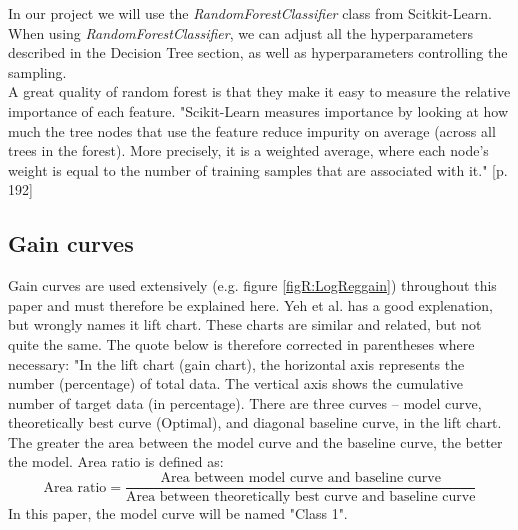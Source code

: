 \documentclass[12pt]{article}
\numberwithin{figure}{section}
\begin{document}
In our project we will use the \textit{RandomForestClassifier} class from Scitkit-Learn. When using \textit{RandomForestClassifier}, we can adjust all the hyperparameters described in the Decision Tree section, as well as hyperparameters controlling the sampling.\\
A great quality of random forest is that they make it easy to measure the relative importance of each feature. "Scikit-Learn measures importance by looking at how much the tree nodes that use the feature reduce impurity on average (across all trees in the forest). More precisely, it is a weighted average, where each node's weight is equal to the number of training samples that are associated with it." \cite{Geron}[p. 192] 
\subsection{Gain curves}
Gain curves are used extensively (e.g. figure \ref{figR:LogReggain}) throughout this paper and must therefore be explained here. Yeh et al. \cite{yeh} has a good explenation, but wrongly names it lift chart. These charts are similar and related, but not quite the same. The quote below is therefore corrected in parentheses where necessary:
"In the lift chart (gain chart), the horizontal
axis represents the number (percentage) of total data. The vertical
axis shows the cumulative number of target data (in percentage). There are
three curves – model curve, theoretically best
curve (Optimal), and diagonal baseline curve, in the lift chart. The greater the area between the model curve and the baseline curve, the better the model. Area
ratio is defined as:
\begin{equation}
\text{Area ratio} = \frac{\text{Area between model curve and baseline curve}}{\text{Area between theoretically best curve and baseline curve}}
\end{equation}
In this paper, the model curve will be named "Class 1".
\end{document}
